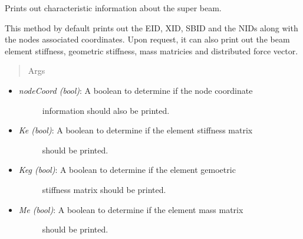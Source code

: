 \documentclass[letterpaper,10pt,english]{sphinxmanual}
\begin{document}
\begin{fulllineitems}
\begin{fulllineitems}
\begin{itemize}
\end{itemize}

\end{fulllineitems}


\begin{fulllineitems}
\label{structures:AeroComBAT.Structures.SuperBeam.printSummary}
Prints out characteristic information about the super beam.

This method by default prints out the EID, XID, SBID and the NIDs along
with the nodes associated coordinates. Upon request, it can also print
out the beam element stiffness, geometric stiffness, mass matricies and
distributed force vector.
\begin{quote}\begin{description}
\item[{Args}] \leavevmode
\end{description}\end{quote}
\begin{itemize}
\item {} \begin{description}
\item[{\emph{nodeCoord (bool)}: A boolean to determine if the node coordinate}] \leavevmode
information should also be printed.

\end{description}

\item {} \begin{description}
\item[{\emph{Ke (bool)}: A boolean to determine if the element stiffness matrix}] \leavevmode
should be printed.

\end{description}

\item {} \begin{description}
\item[{\emph{Keg (bool)}: A boolean to determine if the element gemoetric}] \leavevmode
stiffness matrix should be printed.

\end{description}

\item {} \begin{description}
\item[{\emph{Me (bool)}: A boolean to determine if the element mass matrix}] \leavevmode
should be printed.


\end{description}
\end{itemize}
\end{fulllineitems}
\end{fulllineitems}
\end{document}
